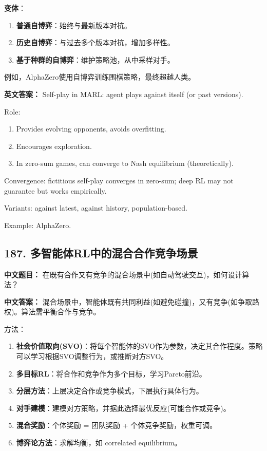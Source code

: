 \documentclass[10pt,a4paper]{ctexart}
\begin{document}
\textbf{变体}：
\begin{enumerate}
    \item \textbf{普通自博弈}：始终与最新版本对抗。
    \item \textbf{历史自博弈}：与过去多个版本对抗，增加多样性。
    \item \textbf{基于种群的自博弈}：维护策略池，从中采样对手。
\end{enumerate}

例如，AlphaZero使用自博弈训练围棋策略，最终超越人类。

\textbf{英文答案：}  
Self-play in MARL: agent plays against itself (or past versions).

Role:
\begin{enumerate}
    \item Provides evolving opponents, avoids overfitting.
    \item Encourages exploration.
    \item In zero-sum games, can converge to Nash equilibrium (theoretically).
\end{enumerate}

Convergence: fictitious self-play converges in zero-sum; deep RL may not guarantee but works empirically.

Variants: against latest, against history, population-based.

Example: AlphaZero.

\subsection*{187. 多智能体RL中的混合合作竞争场景}
\textbf{中文题目：} 在既有合作又有竞争的混合场景中(如自动驾驶交互)，如何设计算法？

\textbf{中文答案：}  
混合场景中，智能体既有共同利益(如避免碰撞)，又有竞争(如争取路权)。算法需平衡合作与竞争。

方法：
\begin{enumerate}
    \item \textbf{社会价值取向(SVO)}：将每个智能体的SVO作为参数，决定其合作程度。策略可以学习根据SVO调整行为，或推断对方SVO。
    \item \textbf{多目标RL}：将合作和竞争作为多个目标，学习Pareto前沿。
    \item \textbf{分层方法}：上层决定合作或竞争模式，下层执行具体行为。
    \item \textbf{对手建模}：建模对方策略，并据此选择最优反应(可能合作或竞争)。
    \item \textbf{混合奖励}：个体奖励 = 团队奖励 + 个体竞争奖励，权重可调。
    \item \textbf{博弈论方法}：求解均衡，如 correlated equilibrium。
\end{enumerate}
\end{document}
